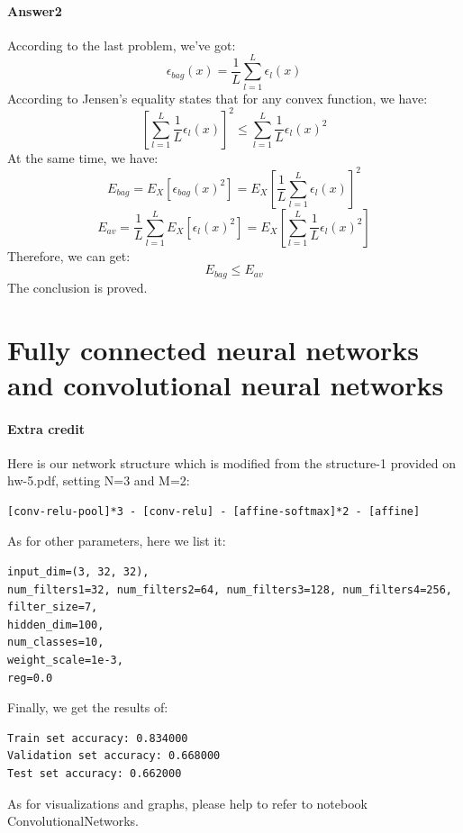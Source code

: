 \documentclass[paper=a4, fontsize=11pt]{scrartcl} %
\numberwithin{equation}{section} %
\numberwithin{figure}{section} %
\numberwithin{table}{section} %
\begin{document}
\paragraph{\textbf{Answer2}}
According to the last problem, we've got:
\begin{equation*}
\epsilon _{bag}\left ( x \right )=\frac{1}{L}\sum_{l=1}^{L}\epsilon _{l}\left ( x \right )
\end{equation*}
According to Jensen's equality states that for any convex function, we have:
\begin{equation*}
\left [ \sum_{l=1}^{L}\frac{1}{L}\epsilon _{l}\left ( x \right ) \right ]^{2}\leq \sum_{l=1}^{L}\frac{1}{L}\epsilon _{l}\left ( x \right )^{2}
\end{equation*}
At the same time, we have:
\begin{equation*}
E_{bag}=E_{X}\left [ \epsilon _{bag}\left ( x \right )^{2} \right ]=E_{X}\left [ \frac{1}{L}\sum_{l=1}^{L}\epsilon _{l}\left ( x \right ) \right ]^{2}
\end{equation*}
\begin{equation*}
E_{av}=\frac{1}{L}\sum_{l=1}^{L}E_{X}\left [ \epsilon _{l}\left ( x \right )^{2} \right ]=E_{X}\left [ \sum_{l=1}^{L}\frac{1}{L}\epsilon _{l}\left ( x \right )^{2} \right ]
\end{equation*}
Therefore, we can get:
\begin{equation*}
E_{bag} \leq E_{av}
\end{equation*}
The conclusion is proved.

\section{Fully connected neural networks and convolutional neural networks}
\paragraph{\textbf{Extra credit}}
Here is our network structure which is modified from the structure-1 provided on hw-5.pdf, setting N=3 and M=2:
\begin{verbatim}
[conv-relu-pool]*3 - [conv-relu] - [affine-softmax]*2 - [affine]
\end{verbatim}
As for other parameters, here we list it:
\begin{verbatim}
input_dim=(3, 32, 32), 
num_filters1=32, num_filters2=64, num_filters3=128, num_filters4=256, 
filter_size=7, 
hidden_dim=100, 
num_classes=10, 
weight_scale=1e-3, 
reg=0.0
\end{verbatim}
Finally, we get the results of:
\begin{verbatim}
Train set accuracy: 0.834000
Validation set accuracy: 0.668000
Test set accuracy: 0.662000
\end{verbatim}
As for visualizations and graphs, please help to refer to notebook ConvolutionalNetworks.
\end{document}
